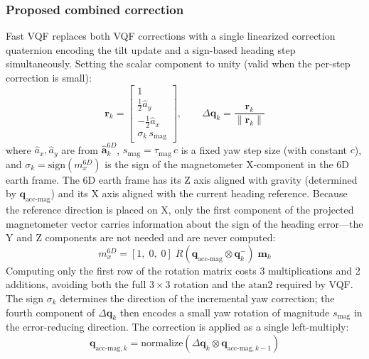 \documentclass[conference]{IEEEtran}
\begin{document}
\subsubsection*{Proposed combined correction}

Fast VQF replaces both VQF corrections with a single linearized correction quaternion encoding the tilt update and a sign-based heading step simultaneously. Setting the scalar component to unity (valid when the per-step correction is small):
\begin{equation}
    \mathbf{r}_k =
    \begin{bmatrix}
        1 \\
        \tfrac{1}{2}\hat{a}_y \\
        -\tfrac{1}{2}\hat{a}_x \\
        \sigma_k\, s_\text{mag}
    \end{bmatrix},
    \qquad
    \Delta\mathbf{q}_k = \frac{\mathbf{r}_k}{\|\mathbf{r}_k\|}
    \label{eq:combined}
\end{equation}
where $\hat{a}_x, \hat{a}_y$ are from $\hat{\mathbf{a}}_k^{6D}$, $s_\text{mag} = \tau_\text{mag}\,c$ is a fixed yaw step size (with constant $c$), and $\sigma_k = \mathrm{sign}(m_x^{6D})$ is the sign of the magnetometer X-component in the 6D earth frame. The 6D earth frame has its Z axis aligned with gravity (determined by $\mathbf{q}_\text{acc-mag}$) and its X axis aligned with the current heading reference. Because the reference direction is placed on X, only the first component of the projected magnetometer vector carries information about the sign of the heading error—the Y and Z components are not needed and are never computed:
\begin{equation}
    m_x^{6D} = [1,\;0,\;0]\; R(\mathbf{q}_\text{acc-mag} \otimes \mathbf{q}_k^-)\;\mathbf{m}_k
    \label{eq:magx}
\end{equation}
Computing only the first row of the rotation matrix costs 3 multiplications and 2 additions, avoiding both the full $3{\times}3$ rotation and the $\mathrm{atan2}$ required by VQF. The sign $\sigma_k$ determines the direction of the incremental yaw correction; the fourth component of $\Delta\mathbf{q}_k$ then encodes a small yaw rotation of magnitude $s_\text{mag}$ in the error-reducing direction. The correction is applied as a single left-multiply:
\begin{equation}
    \mathbf{q}_{\text{acc-mag},k} = \mathrm{normalize}\!\left(\Delta\mathbf{q}_k \otimes \mathbf{q}_{\text{acc-mag},k-1}\right)
    \label{eq:update}
\end{equation}
\end{document}
